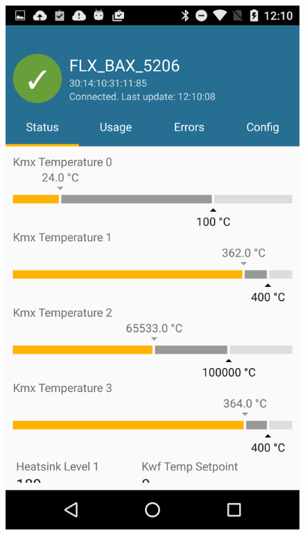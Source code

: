 \begin{figure}[h!]
\centering
    \includegraphics[scale=0.09]{results/res/device_status}

\end{figure}
